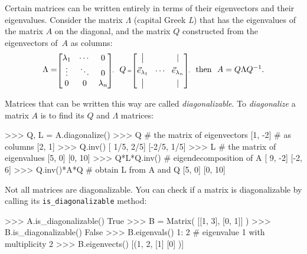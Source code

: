 		Certain matrices can be written entirely in terms of their eigenvectors and their eigenvalues.
		Consider the matrix $\Lambda$ (capital Greek \emph{L}) that has the eigenvalues of the matrix $A$ on the diagonal, 
		and the matrix $Q$ constructed from the eigenvectors of~$A$ as columns:
		    \[
		     \Lambda = 
		    \scriptscriptstyle
		     \begin{bmatrix}
		     \lambda_1	&  \cdots  &  0 \\
		     \vdots 	&  \ddots  &  0  \\
		     0  	&   0      &  \lambda_n
		     \end{bmatrix}\!,
		     \ \ 
		     {\textstyle Q} \: 
		     = 
		     \begin{bmatrix}
		     \big|  &  &\Huge| \\[1.2mm]
		     \vec{e}_{\lambda_1}  & \!  \cdots \! &  \large\vec{e}_{\lambda_n} \\[1.2mm]
		     \big|  &  & \Huge| 
		     \end{bmatrix}\!,
		     \ \ 
		     {\textstyle
		     \textrm{then}
		     \ \ 
		     A =  Q\Lambda Q^{-1}.
		     }
		    \]

		Matrices that can be written this way are called \emph{diagonalizable}.		
To \emph{diagonalize} a matrix $A$ is to find its $Q$ and $\Lambda$ matrices:

\small
\begin{verbatimtab}
>>> Q, L = A.diagonalize()
>>> Q               # the matrix of eigenvectors 
[1,  -2]            # as columns 
[2,   1]
>>> Q.inv()
[ 1/5, 2/5]
[-2/5, 1/5]
>>> L               # the matrix of eigenvalues
[5,  0]
[0, 10]
>>> Q*L*Q.inv()     # eigendecomposition of A
[ 9, -2]
[-2,  6]
>>> Q.inv()*A*Q     # obtain L from A and Q 
[5,  0]
[0, 10]
\end{verbatimtab}
\normalsize
		
		
Not all matrices are diagonalizable.
You can check if a matrix is diagonalizable by calling its \texttt{is\_diagonalizable} method:

\small
\begin{verbatimtab}
>>> A.is_diagonalizable()
True
>>> B = Matrix( [[1, 3],
  	         [0, 1]] )
>>> B.is_diagonalizable()
False
>>> B.eigenvals()
{1: 2}              # eigenvalue 1 with multiplicity 2
>>> B.eigenvects()
[(1, 2,  [1]
         [0]  )]
\end{verbatimtab}
\normalsize

